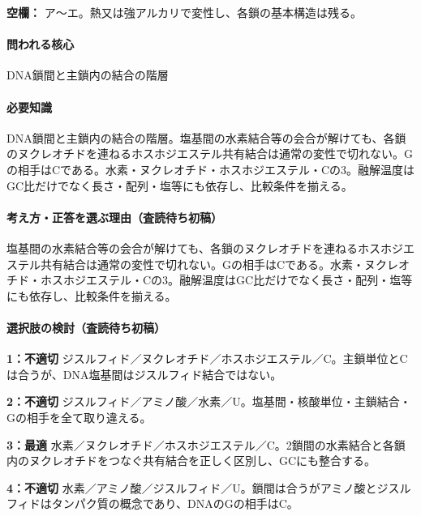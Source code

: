 \noindent\textbf{空欄：} ア〜エ。熱又は強アルカリで変性し、各鎖の基本構造は残る。\par

\paragraph{問われる核心} DNA鎖間と主鎖内の結合の階層

\paragraph{必要知識} DNA鎖間と主鎖内の結合の階層。塩基間の水素結合等の会合が解けても、各鎖のヌクレオチドを連ねるホスホジエステル共有結合は通常の変性で切れない。Gの相手はCである。水素・ヌクレオチド・ホスホジエステル・Cの3。融解温度はGC比だけでなく長さ・配列・塩等にも依存し、比較条件を揃える。

\paragraph{考え方・正答を選ぶ理由（査読待ち初稿）} 塩基間の水素結合等の会合が解けても、各鎖のヌクレオチドを連ねるホスホジエステル共有結合は通常の変性で切れない。Gの相手はCである。水素・ヌクレオチド・ホスホジエステル・Cの3。融解温度はGC比だけでなく長さ・配列・塩等にも依存し、比較条件を揃える。

\paragraph{選択肢の検討（査読待ち初稿）}\mbox{}\par

\noindent\textbf{1：不適切} ジスルフィド／ヌクレオチド／ホスホジエステル／C。主鎖単位とCは合うが、DNA塩基間はジスルフィド結合ではない。\par

\noindent\textbf{2：不適切} ジスルフィド／アミノ酸／水素／U。塩基間・核酸単位・主鎖結合・Gの相手を全て取り違える。\par

\noindent\textbf{3：最適} 水素／ヌクレオチド／ホスホジエステル／C。2鎖間の水素結合と各鎖内のヌクレオチドをつなぐ共有結合を正しく区別し、GCにも整合する。\par

\noindent\textbf{4：不適切} 水素／アミノ酸／ジスルフィド／U。鎖間は合うがアミノ酸とジスルフィドはタンパク質の概念であり、DNAのGの相手はC。\par

